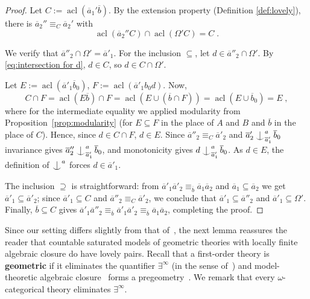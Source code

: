 \documentclass{article}
\theoremstyle{remark}
\theoremstyle{definition}
\DeclareMathOperator{\acl}{acl}
\def\a{\overline{a}}
\def\b{\overline{b}}
\def\Ind#1#2{#1\setbox0=\hbox{$#1x$}\kern\wd0\hbox to 0pt{\hss$#1\mid$\hss}
	\lower.9\ht0\hbox to 0pt{\hss$#1\smile$\hss}\kern\wd0}
\def\ind{\mathop{\mathpalette\Ind{}}}
\begin{document}
{{{{{\begin{proof}
{ Let $C:=\acl(\overline{a}_1'\overline{b})$. By the extension property (Definition \ref{def:lovely}),  }
there is $\overline{a}_2''\equiv_C\overline{a}_2'$ with
    \begin{equation}\label{eq:intersection for d}
        \acl(\overline{a}_2'' C)\cap\acl(\Omega'C)=C\;.
    \end{equation}

    { We verify that $\overline{a}''_2 \cap \Omega' = \overline{a}'_1$. For the
  inclusion $\subseteq$, let $d \in \overline{a}''_2 \cap \Omega'$. %
  By
  \eqref{eq:intersection for d}, $d \in C$, so $d \in C \cap \Omega'$. 

  {Let $E:=\acl(\a'_1 \b_0)$, $F:=\acl(\a'_1 b_0 d)$. Now,}
  \[C\cap F=\acl(E\b)\cap F=\acl(E\cup(\b\cap F))=\acl(E\cup\b_0)=E\;,\]
  {where for the intermediate equality we applied modularity from Proposition~\ref{prop:modularity} (for $E\subseteq F$ in the place of $A$ and $B$ and $\b$ in the place of $C$). Hence, since $d\in C\cap F$, $d\in E$.}
  {Since $\overline{a}''_2 \equiv_C \overline{a}'_2$ and $\overline{a}'_2 \ind^{a}_{\overline{a}'_1} \overline{b}_0$
  invariance gives  $\overline{a}''_2 \ind^{a}_{\overline{a}'_1} \overline{b}_0$, and  monotonicity gives $d \ind^{a}_{\overline{a}'_1} \overline{b}_0$. As   $d \in E$,  the definition of $\ind^{a}$  forces $d \in \overline{a}'_1$.}} The inclusion $\supseteq$ is straightforward: from
  $\overline{a}'_1 \overline{a}'_2 \equiv_{\overline{b}}
  \overline{a}_1 \overline{a}_2$ and $\overline{a}_1 \subseteq \overline{a}_2$
  we get $\overline{a}'_1 \subseteq \overline{a}'_2$; since
  $\overline{a}'_1 \subseteq C$ and $\overline{a}''_2 \equiv_C \overline{a}'_2$, we conclude that  $\overline{a}'_1 \subseteq \overline{a}''_2$ and
  $\overline{a}'_1 \subseteq \Omega'$.  Finally, $\overline{b} \subseteq C$ gives
  $\overline{a}'_1 \overline{a}''_2 \equiv_{\overline{b}}
  \overline{a}'_1 \overline{a}'_2 \equiv_{\overline{b}}
  \overline{a}_1 \overline{a}_2$, completing the proof.
\end{proof}





Since our setting differs slightly from that
of~\cite{berenstein2010lovely}, the next lemma reassures the reader that
countable saturated models of geometric theories with locally finite
algebraic closure do have lovely pairs. Recall that a first-order theory is \textbf{geometric} if it eliminates the quantifier $\exists^{\infty}$ (in the sense of~\cite[Definition 5.5.6]{tent2012course}) and model-theoretic algebraic closure~\cite[Definition 5.6.1]{tent2012course} forms a pregeometry~\cite[Definition 5.6.5]{tent2012course}. We remark that every $\omega$-categorical theory eliminates $\exists^\infty$.

}}}}}
\end{document}
